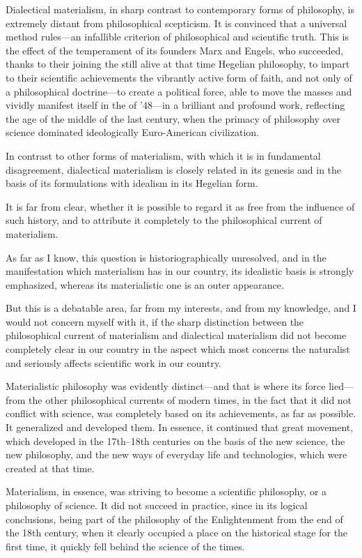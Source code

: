 Dialectical materialism, in sharp contrast to contemporary forms of philosophy,
is extremely distant from philosophical scepticism.  It is convinced that a
universal method rules---an infallible criterion of philosophical and
scientific truth.  This is the effect of the temperament of its founders Marx
and Engels, who succeeded, thanks to their joining the still alive at that time
Hegelian philosophy, to impart to their scientific achievements the vibrantly
active form of faith, and not only of a philosophical doctrine---to create a
political force, able to move the masses and vividly manifest itself in the
 of '48---in a brilliant and profound work,
reflecting the age of the middle of the last century, when the primacy of
philosophy over science dominated ideologically Euro-American civilization.

In contrast to other forms of materialism, with which it is in fundamental
disagreement, dialectical materialism is closely related in its genesis and in
the basis of its formulations with idealism in its Hegelian form.

It is far from clear, whether it is possible to regard it as free from the
influence of such history, and to attribute it completely to the philosophical
current of materialism.

As far as I know, this question is historiographically unresolved, and in the
manifestation which materialism has in our country, its idealistic basis is
strongly emphasized, whereas its materialistic one is an outer appearance.

But this is a debatable area, far from my interests, and from my knowledge, and
I would not concern myself with it, if the sharp distinction between the
philosophical current of materialism and dialectical materialism did not become
completely clear in our country in the aspect which most concerns the
naturalist and seriously affects scientific work in our country.

Materialistic philosophy was evidently distinct---and that is where its force
lied---from the other philosophical currents of modern times, in the fact that
it did not conflict with science, was completely based on its achievements, as
far as possible.  It generalized and developed them.  In essence, it continued
that great movement, which developed in the 17th--18th centuries on the basis
of the new science, the new philosophy, and the new ways of everyday life and
technologies, which were created at that time.

Materialism, in essence, was striving to become a scientific philosophy, or a
philosophy of science.  It did not succeed in practice, since in its logical
conclusions, being part of the philosophy of the Enlightenment from the end of
the 18th century, when it clearly occupied a place on the historical stage for
the first time, it quickly fell behind the science of the times.

